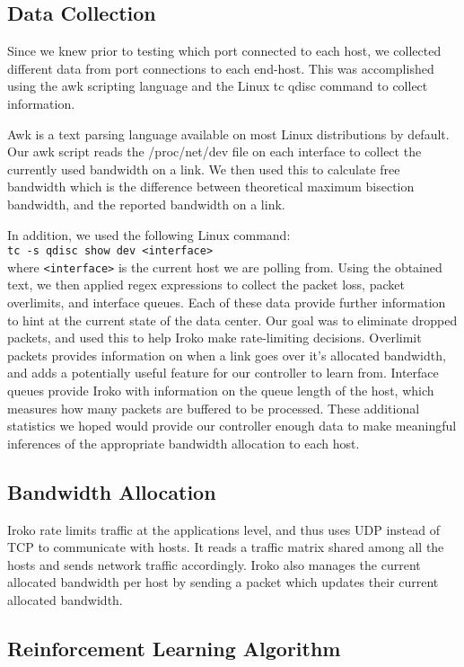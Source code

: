 \subsection{Data Collection }
Since we knew prior to testing which port connected to each host, we collected different data from port connections to each end-host. This was accomplished using the awk scripting language and the Linux tc qdisc command to collect information.

Awk is a text parsing language available on most Linux distributions by default. Our awk script reads the /proc/net/dev file on each interface to collect the currently used  bandwidth on a link. We then used this to calculate free bandwidth which is the difference between theoretical maximum bisection bandwidth, and the reported bandwidth on a link.


In addition, we used the following Linux command:\\
\texttt{tc -s qdisc show dev <interface>}\\
where \texttt{<interface>} is the current host we are polling from. Using the 
obtained text, we then applied regex expressions to collect the packet loss, 
packet overlimits, and interface queues. Each of these data provide further 
information to hint at the current state of the data center. Our goal was to 
eliminate dropped packets, and used this to help Iroko make rate-limiting 
decisions. Overlimit packets provides information on when a link goes over it’s 
allocated bandwidth, and adds a potentially useful feature for our controller 
to learn from. Interface queues provide Iroko with information on the queue 
length of the host, which measures how many packets are buffered to be 
processed.  These additional statistics we hoped would provide our controller 
enough data to make meaningful inferences of the appropriate bandwidth 
allocation to each host. 

\subsection{Bandwidth Allocation}
Iroko rate limits traffic at the applications level, and thus uses UDP instead of TCP to communicate with hosts. It reads a traffic matrix shared among all the hosts and sends network traffic accordingly. Iroko also manages the current allocated bandwidth per host by sending a packet which updates their current allocated bandwidth.


\subsection{Reinforcement Learning Algorithm}

